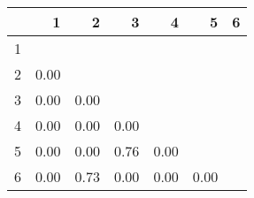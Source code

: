 \begin{tabular}{r|rrrrrr}
  & 1 & 2 & 3 & 4 & 5 & 6 \\ 
  \hline
1 &  &  &  &  &  &  \\ 
  2 & 0.00 &  &  &  &  &  \\ 
  3 & 0.00 & 0.00 &  &  &  &  \\ 
  4 & 0.00 & 0.00 & 0.00 &  &  &  \\ 
  5 & 0.00 & 0.00 & 0.76 & 0.00 &  &  \\ 
  6 & 0.00 & 0.73 & 0.00 & 0.00 & 0.00 &  \\ 
   \hline
\end{tabular}
